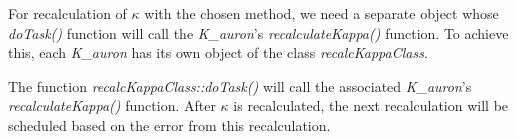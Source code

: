 		For recalculation of $\kappa$ with the chosen method, we need a separate object whose \emph{doTask()} function will call the \emph{K\_auron}'s \emph{recalculateKappa()} function.
		To achieve this, each \emph{K\_auron} has its own object of the class \emph{recalcKappaClass}.

		The function \emph{recalcKappaClass::doTask()} will call the associated \emph{K\_auron}'s \emph{recalculateKappa()} function.
		After $\kappa$ is recalculated, the next recalculation will be scheduled based on the error from this recalculation. 
		





